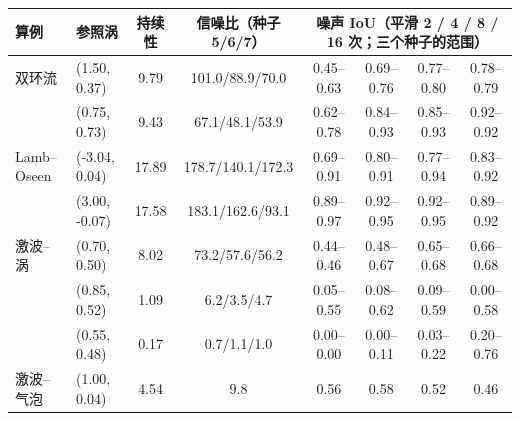 \begin{tabular}{llcccccc}\toprule 算例 & 参照涡 & 持续性 & 信噪比（种子 5/6/7） & \multicolumn{4}{c}{噪声 IoU（平滑 2 / 4 / 8 / 16 次；三个种子的范围）}\\\midrule
双环流 & (1.50, 0.37) & 9.79 & 101.0/88.9/70.0 & 0.45–0.63 & 0.69–0.76 & 0.77–0.80 & 0.78–0.79\\
 & (0.75, 0.73) & 9.43 & 67.1/48.1/53.9 & 0.62–0.78 & 0.84–0.93 & 0.85–0.93 & 0.92–0.92\\
Lamb–Oseen & (-3.04, 0.04) & 17.89 & 178.7/140.1/172.3 & 0.69–0.91 & 0.80–0.91 & 0.77–0.94 & 0.83–0.92\\
 & (3.00, -0.07) & 17.58 & 183.1/162.6/93.1 & 0.89–0.97 & 0.92–0.95 & 0.92–0.95 & 0.89–0.92\\
激波–涡 & (0.70, 0.50) & 8.02 & 73.2/57.6/56.2 & 0.44–0.46 & 0.48–0.67 & 0.65–0.68 & 0.66–0.68\\
 & (0.85, 0.52) & 1.09 & 6.2/3.5/4.7 & 0.05–0.55 & 0.08–0.62 & 0.09–0.59 & 0.00–0.58\\
 & (0.55, 0.48) & 0.17 & 0.7/1.1/1.0 & 0.00–0.00 & 0.00–0.11 & 0.03–0.22 & 0.20–0.76\\
激波–气泡 & (1.00, 0.04) & 4.54 & 9.8 & 0.56 & 0.58 & 0.52 & 0.46\\
\bottomrule\end{tabular}